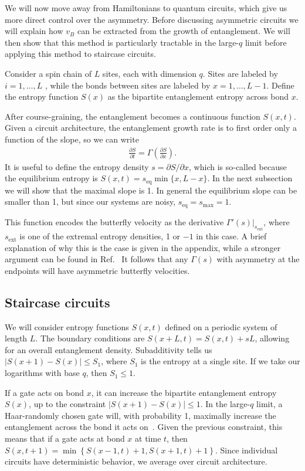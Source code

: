\documentclass[aps,prx,reprint,superscriptaddress, longbibliography]{revtex4-1}
\newcommand{\charlie}[1]{{\color{Magenta}{{#1}}}}
\begin{document}
We will now move away from Hamiltonians to quantum circuits, which give us more direct control over the asymmetry. 
Before discussing asymmetric circuits we will explain how $v_B$ can be extracted from the growth of entanglement. We will then show that this method is particularly tractable in the large-$q$ limit before applying this method to staircase circuits. 

Consider a spin chain of $L$ sites, each with dimension $q$. Sites are labeled by $i = 1,\dots, L$ , while the bonds between sites are labeled by $x = 1, \dots, L - 1$. Define the entropy function $S(x)$ as the bipartite entanglement entropy across bond $x$. 

After course-graining, the entanglement becomes a continuous function $S(x,t)$. Given a circuit architecture, the entanglement growth rate is to first order only a function of the slope, so we can write \cite{Jonay}
\begin{align}
\frac{\partial S}{\partial t} = \Gamma\left(\frac{\partial S}{\partial x}\right).
\end{align}
It is useful to define the entropy density $s = \partial S / \partial x$, which is so-called because the equilibrium entropy is $S(x, t) = s_\text{eq} \min\{x, L - x\}$.  In the next subsection we will show that the maximal slope is 1. In general the equilibrium slope can be smaller than 1, but since our systems are noisy, $s_\text{eq} = s_\text{max} = 1$.

This function encodes the butterfly velocity as the derivative $\Gamma'(s)|_{s_\text{ext}}$, where $s_\text{ext}$ is one of the extremal entropy densities, 1 or $-1$ in this case. A brief explanation of why this is the case is given in the appendix, while a stronger argument can be found in Ref.~\cite{Jonay}
It follows that any $\Gamma(s)$ with asymmetry at the endpoints will have asymmetric butterfly velocities.

\subsection{Staircase circuits}

We will consider entropy functions $S(x,t)$ defined on a periodic system of length $L$. The boundary conditions are $S(x+L,t) = S(x,t)+sL$, allowing for an overall entanglement density.
Subadditivity tells us $|S(x + 1) - S(x)| \le S_1$, where $S_1$ is the entropy at a single site. If we take our logarithms with base $q$, then $S_1 \le 1$.

If a gate acts on bond $x$, it can increase the bipartite entanglement entropy $S(x)$, up to the constraint $|S(x + 1) - S(x)| \le 1$. In the large-$q$ limit, a Haar-randomly chosen gate will, with probability 1, maximally increase the entanglement across the bond it acts on~\cite{nahum2017quantum}. Given the previous constraint, this means that if a gate acts at bond $x$ at time $t$, then $S(x, t+1) = \min\left\lbrace S(x-1,t)+1, S(x+1,t)+1\right\rbrace$. \charlie{Should we explain why?} Since individual circuits have deterministic behavior, we average over circuit architecture. 
\end{document}
